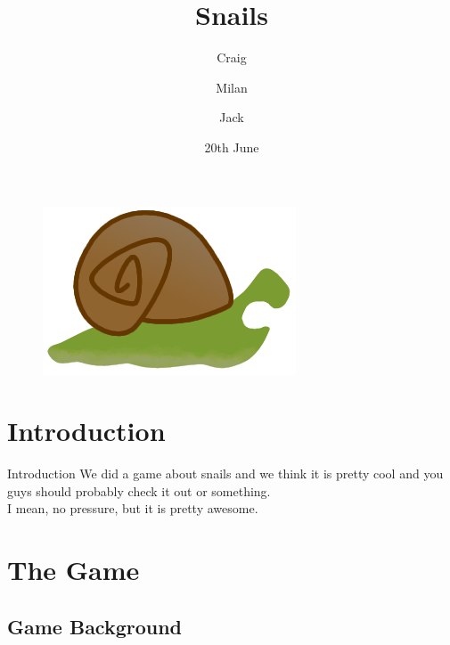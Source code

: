 \documentclass{beamer}
\title{Snails}
\author{Craig \and Milan \and Jack}
\date{20th June}
\begin{document}
\begin{frame}
  \titlepage
  \vspace{\baselineskip}
  \begin{figure}
    \includegraphics[scale=0.15]{snail_teeth.png}
  \end{figure}
\end{frame}

\section{Introduction}

\begin{frame}{Introduction}
  We did a game about snails and we think it is pretty cool and you guys should probably check it out or something. \\
  \vspace{\baselineskip}
  I mean, no pressure, but it is pretty awesome.
\end{frame}


\section{The Game}
\subsection{Game Background}
\end{document}

